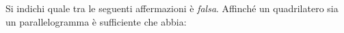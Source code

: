 Si indichi quale tra le seguenti affermazioni è \emph{falsa}.
Affinché un quadrilatero sia un parallelogramma è sufficiente
che abbia: